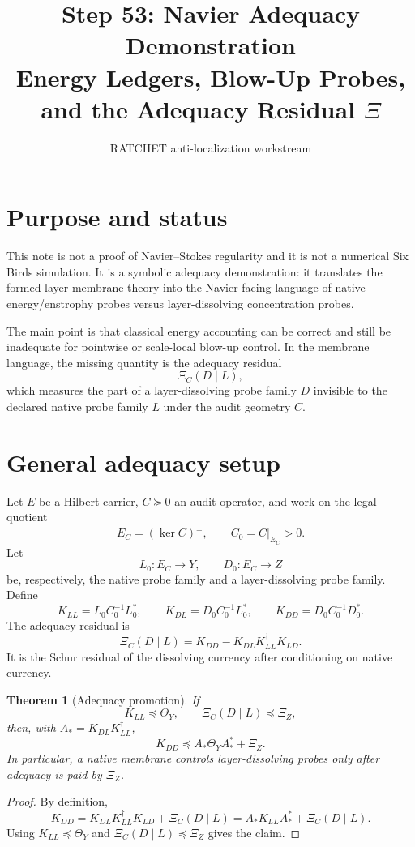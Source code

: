\documentclass[11pt]{article}
\title{Step 53: Navier Adequacy Demonstration\\
\large Energy Ledgers, Blow-Up Probes, and the Adequacy Residual $\Xi$}
\author{RATCHET anti-localization workstream}
\date{}
\newtheorem{theorem}{Theorem}
\begin{document}
\maketitle

\section{Purpose and status}

This note is not a proof of Navier--Stokes regularity and it is not a numerical Six Birds simulation.  It is a symbolic adequacy demonstration: it translates the formed-layer membrane theory into the Navier-facing language of native energy/enstrophy probes versus layer-dissolving concentration probes.

The main point is that classical energy accounting can be correct and still be inadequate for pointwise or scale-local blow-up control.  In the membrane language, the missing quantity is the adequacy residual
\[
\Xi_C(D\mid L),
\]
which measures the part of a layer-dissolving probe family $D$ invisible to the declared native probe family $L$ under the audit geometry $C$.

\section{General adequacy setup}

Let $E$ be a Hilbert carrier, $C\succeq0$ an audit operator, and work on the legal quotient
\[
E_C=(\ker C)^\perp,
\qquad C_0=C|_{E_C}>0.
\]
Let
\[
L_0:E_C\to Y,
\qquad D_0:E_C\to Z
\]
be, respectively, the native probe family and a layer-dissolving probe family.  Define
\[
K_{LL}=L_0C_0^{-1}L_0^*,
\qquad
K_{DL}=D_0C_0^{-1}L_0^*,
\qquad
K_{DD}=D_0C_0^{-1}D_0^*.
\]
The adequacy residual is
\[
\boxed{
\Xi_C(D\mid L)=K_{DD}-K_{DL}K_{LL}^{\dagger}K_{LD}.
}
\]
It is the Schur residual of the dissolving currency after conditioning on native currency.

\begin{theorem}[Adequacy promotion]
If
\[
K_{LL}\preceq \Theta_Y,
\qquad
\Xi_C(D\mid L)\preceq \Xi_Z,
\]
then, with $A_*=K_{DL}K_{LL}^{\dagger}$,
\[
\boxed{
K_{DD}\preceq A_*\Theta_YA_*^*+\Xi_Z.
}
\]
In particular, a native membrane controls layer-dissolving probes only after adequacy is paid by $\Xi_Z$.
\end{theorem}

\begin{proof}
By definition,
\[
K_{DD}=K_{DL}K_{LL}^{\dagger}K_{LD}+\Xi_C(D\mid L)=A_*K_{LL}A_*^*+\Xi_C(D\mid L).
\]
Using $K_{LL}\preceq\Theta_Y$ and $\Xi_C(D\mid L)\preceq\Xi_Z$ gives the claim.
\end{proof}
\end{document}
